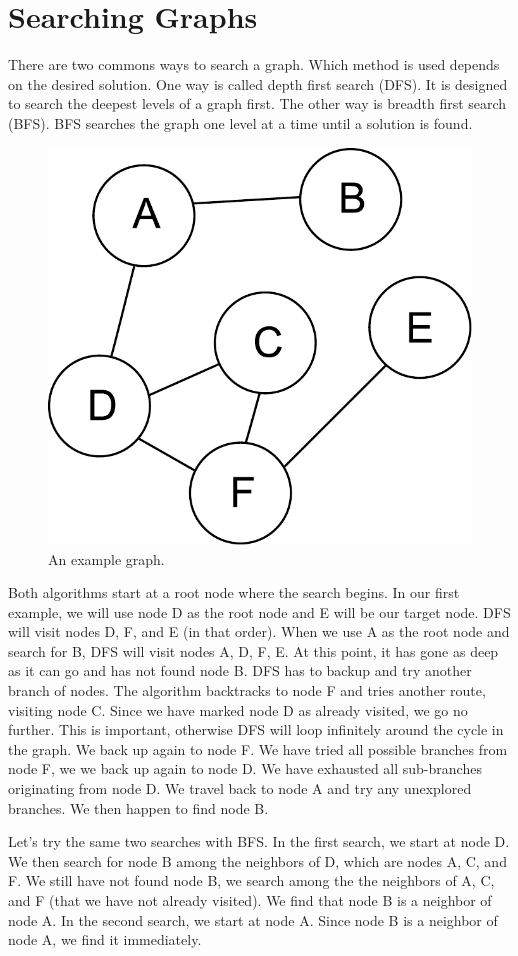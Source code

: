 \section*{Searching Graphs}
There are two commons ways to search a graph.
Which method is used depends on the desired solution.
One way is called depth first search (DFS).  It is designed to search the deepest levels of a graph first.
The other way is breadth first search (BFS).  BFS searches the graph one level at a time until a solution is found.
\begin{figure}[h]
\centering
\includegraphics[width=.5\textwidth]{graph.pdf}
\caption{An example graph.}
\label{fig:bfs_dfs_graph}
\end{figure}

Both algorithms start at a root node where the search begins.
In our first example, we will use node D as the root node and E will be our target node.
DFS will visit nodes D, F, and E (in that order).
When we use A as the root node and search for B, DFS will visit nodes A, D, F, E.
At this point, it has gone as deep as it can go and has not found node B.
DFS has to backup and try another branch of nodes.
The algorithm backtracks to node F and tries another route, visiting node C.
Since we have marked node D as already visited, we go no further.
This is important, otherwise DFS will loop infinitely around the cycle in the graph.
We back up again to node F.  We have tried all possible branches from node F, we we back up again to node D.
We have exhausted all sub-branches originating from node D.
We travel back to node A and try any unexplored branches.
We then happen to find node B.

Let's try the same two searches with BFS.
In the first search, we start at node D.
We then search for node B among the neighbors of D, which are nodes A, C, and F.
We still have not found node B, we search among the the neighbors of A, C, and F (that we have not already visited).
We find that node B is a neighbor of node A.
In the second search, we start at node A.  Since node B is a neighbor of node A, we find it immediately.

